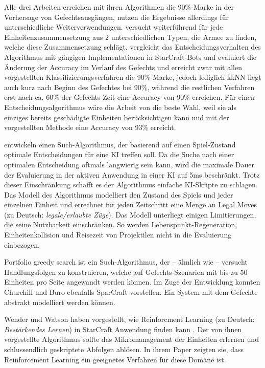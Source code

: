 Alle drei Arbeiten erreichen mit ihren Algorithmen die 90\%-Marke in der Vorhersage von Gefechtsausgängen, nutzen die Ergebnisse allerdings für unterschiedliche Weiterverwendungen. \textcite{AIIDE137381} versucht weiterführend für jede Einheitenzusammensetzung aus 2 unterschiedlichen Typen, die Armee zu finden, welche diese Zusammensetzung schlägt. \textcite{AIIDE1511531} vergleicht das Entscheidungsverhalten des Algorithmus mit gängigen Implementationen in StarCraft-Bots und \textcite{SnchezRuizGranados2015PredictingTO} evaluiert die Änderung der Accuracy im Verlauf des Gefechts und erreicht zwar mit allen vorgestellten Klassifizierungsverfahren die 90\%-Marke, jedoch lediglich kkNN liegt auch kurz nach Beginn des Gefechtes bei 90\%, während die restlichen Verfahren erst nach ca. 60\% der Gefechts-Zeit eine Accuracy von 90\% erreichen. Für einen Entscheidungsalgorithmus wäre die Arbeit von \textcite{AIIDE1511531} die beste Wahl, weil sie als einziges bereits geschädigte Einheiten berücksichtigen kann und mit der vorgestellten Methode eine Accuracy von 93\% erreicht. 

\textcite{DBLP:conf/aiide/ChurchillSB12} entwickeln einen Such-Algorithmus, der basierend auf einen Spiel-Zustand optimale Entscheidungen für eine KI treffen soll. Da die Suche nach einer optimalen Entscheidung oftmals langwierig sein kann, wird die maximale Dauer der Evaluierung in der aktiven Anwendung in einer KI auf 5ms beschränkt. Trotz dieser Einschränkung schafft es der Algorithmus einfache KI-Skripte zu schlagen. Das Modell des Algorithmus modelliert den Zustand des Spiels und jeder einzelnen Einheit und errechnet für jeden Zeitschritt eine Menge an Legal Moves (zu Deutsch: \textit{legale/erlaubte Züge}). Das Modell unterliegt einigen Limitierungen, die seine Nutzbarkeit einschränken. So werden Lebenspunkt-Regeneration, Einheitenkollision und Reisezeit von Projektilen nicht in die Evaluierung einbezogen. 

Portfolio greedy search \parencite{6633643} ist ein Such-Algorithmus, der -- ähnlich wie \textcite{DBLP:conf/aiide/ChurchillSB12} -- versucht Handlungsfolgen zu konstruieren, welche auf Gefechts-Szenarien mit bis zu 50 Einheiten pro Seite angewandt werden können. Im Zuge der Entwicklung konnten Churchill und Buro ebenfalls SparCraft vorstellen. Ein System mit dem Gefechte abstrakt modelliert werden können. 

Wender und Watson haben vorgestellt, wie Reinforcment Learning (zu Deutsch: \textit{Bestärkendes Lernen}) in StarCraft Anwendung finden kann \parencite{6374183}. Der von ihnen vorgestellte Algorithmus sollte das Mikromanagement der Einheiten erlernen und schlussendlich geskriptete Abfolgen ablösen. In ihrem Paper zeigten sie, dass Reinforcement Learning ein geeignetes Verfahren für diese Domäne ist. 

